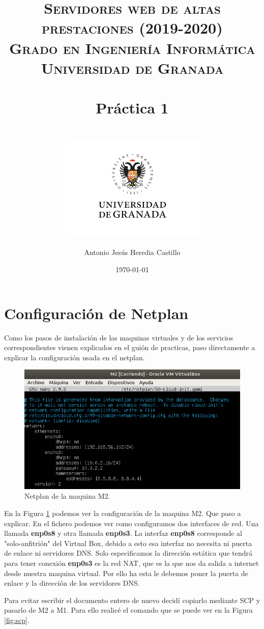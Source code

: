 \documentclass[12pt,a4paper]{article}
\title{
\normalfont \normalsize 
\textsc{{\bf Servidores web de altas prestaciones (2019-2020)} \\ Grado en Ingeniería Informática \\ Universidad de Granada} \\ [25pt] %
\horrule{0.5pt} \\[0.4cm] %
\huge Práctica 1 \\ %
\horrule{2pt} \\[0.5cm] %
\includegraphics{images/logo.png}	
}
\author{Antonio Jesús Heredia Castillo} %
\date{\normalsize\today} %
\begin{document}
\maketitle %
\newpage %
\tableofcontents %
\newpage
\section{Configuración de Netplan}
Como los pasos de instalación de las maquinas virtuales y de los servicios correspondientes vienen explicados en el guión de practicas, paso directamente a explicar la configuración usada en el netplan. 
\begin{figure}[H]
	\centering
	\includegraphics[width=1\linewidth]{images/netplanm2}
	\caption{Netplan de la maquina M2.}
	\label{fig:netplanm2}
\end{figure}
En la Figura \ref{fig:netplanm2} podemos ver la configuración de la maquina M2. Que paso a explicar. En el fichero podemos ver como configuramos dos interfaces de red. Una llamada \textbf{enp0s8} y otra llamada \textbf{enp0s3}. La interfaz \textbf{enp0s8} corresponde al "solo-anfitrión" del Virtual Box, debido a esto esa interfaz no necesita ni puerta de enlace ni servidores DNS. Solo especificamos la dirección estática que tendrá para tener conexión \textbf{enp0s3} es la red NAT, que es la que nos da salida a internet desde nuestra maquina virtual. Por ello ha esta le debemos poner la puerta de enlace y la dirección de los servidores DNS.  

Para evitar escribir el documento entero de nuevo decidí copiarlo mediante SCP y pasarlo de M2 a M1. Para ello realicé el comando que se puede ver en la Figura \ref{fig:scp}. 
\end{document}
